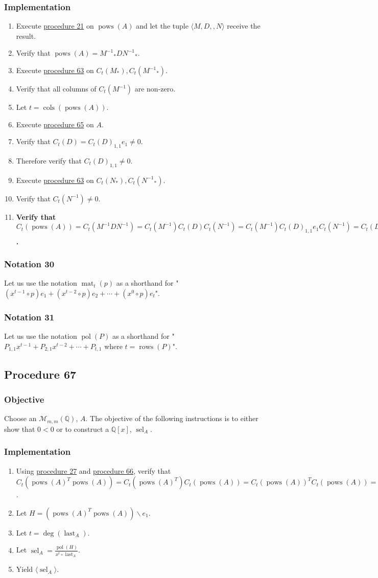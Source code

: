 \documentclass[twocolumn]{article}
\DeclareMathOperator{\mat}{mat}
\DeclareMathOperator{\pol}{pol}
\DeclareMathOperator{\pows}{pows}
\DeclareMathOperator{\cols}{cols}
\DeclareMathOperator{\rows}{rows}
\DeclareMathOperator{\sel}{sel}
\DeclareMathOperator{\last}{last}
\newcommand{\notation}[1]{\subsubsection*{Notation #1}}
\newcommand{\procedure}[2][]{\subsection*{Procedure #2 \ifthenelse{\equal{#1}{}}{}{(#1)}}\label{sec:procedure #2}}
\newcommand{\objective}{\subsubsection*{Objective}}
\newcommand{\implementation}{\subsubsection*{Implementation}}
\begin{document}
			\implementation
				\begin{enumerate}
					\item Execute \hyperref[sec:procedure 21]{procedure 21} on $\pows(A)$ and let the tuple $\langle M,D,,N\rangle$ receive the result.
					\item Verify that $\pows(A)={M^{-1}}_*D{N^{-1}}_*$.
					\item Execute \hyperref[sec:procedure 63]{procedure 63} on $C_t(M_*),C_t({M^{-1}}_*)$.
					\item Verify that all columns of $C_t(M^{-1})$ are non-zero.
					\item Let $t=\cols(\pows(A))$.
					\item Execute \hyperref[sec:procedure 65]{procedure 65} on $A$.
					\item Verify that $C_t(D)={C_t(D)}_{1,1}e_1\ne 0$.
					\item Therefore verify that ${C_t(D)}_{1,1}\ne 0$.
					\item Execute \hyperref[sec:procedure 63]{procedure 63} on $C_t(N_*),C_t({N^{-1}}_*)$.
					\item Verify that $C_t(N^{-1})\ne 0$.
					\item \textbf{Verify that $C_t(\pows(A))=C_t(M^{-1}DN^{-1})=C_t(M^{-1})C_t(D)C_t(N^{-1})=C_t(M^{-1}){C_t(D)}_{1,1}e_1C_t(N^{-1})={C_t(D)}_{1,1}C_t(N^{-1})C_t(M^{-1})e_1\ne 0_{\binom{m^2}{t}\times 1}$.}
				\end{enumerate}
		\notation{30}
			Let us use the notation $\mat_t(p)$ as a shorthand for "$(x^{t-1}\circ p)e_1+(x^{t-2}\circ p)e_2+\cdots+(x^0\circ p)e_t$".
		\notation{31}
			Let us use the notation $\pol(P)$ as a shorthand for "$P_{1,1}x^{t-1}+P_{2,1}x^{t-2}+\cdots+P_{t,1}$ where $t=\rows(P)$".
		\procedure{67}
			\objective
				Choose an $\mathcal{M}_{m,m}(\mathbb{Q})$, $A$. The objective of the following instructions is to either show that $0<0$ or to construct a $\mathbb{Q}[x]$, $\sel_A$.
			\implementation
				\begin{enumerate}
					\item Using \hyperref[sec:procedure 27]{procedure 27} and \hyperref[sec:procedure 66]{procedure 66}, verify that $C_t(\pows(A)^T\pows(A))=C_t(\pows(A)^T)C_t(\pows(A))={C_t(\pows(A))}^TC_t(\pows(A))=\lVert C_t(\pows(A))\rVert^2>0$.
					\item Let $H=(\pows(A)^T\pows(A))\backslash e_1$.
					\item Let $t=\deg(\last_A)$.
					\item Let $\sel_A=\frac{\pol(H)}{x^t\circ\last_A}$.
					\item Yield $\langle\sel_A\rangle$.
				\end{enumerate}
\end{document}
